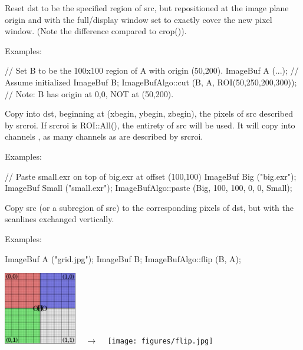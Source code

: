  
\NEW  %
Reset {\cf dst} to be the specified region of {\cf src}, but repositioned at
the image plane origin and with the full/display window set to exactly cover
the new pixel window.  (Note the difference compared to {\cf crop()}).

\smallskip
\noindent Examples:
\begin{code}
    // Set B to be the 100x100 region of A with origin (50,200).
    ImageBuf A (...);  // Assume initialized
    ImageBuf B;
    ImageBufAlgo::cut (B, A, ROI(50,250,200,300));
    // Note: B has origin at 0,0, NOT at (50,200).
\end{code}
\apiend


 
Copy into {\cf dst}, beginning at {\cf (xbegin, ybegin, zbegin)}, the pixels of
{\cf src} described by {\cf srcroi}.  If {\cf srcroi} is {\cf ROI::All()},
the entirety of src will be used.  It will copy into channels 
{\cf [chbegin...]}, as many channels as are described by {\cf srcroi}.

\smallskip
\noindent Examples:
\begin{code}
    // Paste small.exr on top of big.exr at offset (100,100)
    ImageBuf Big ("big.exr");
    ImageBuf Small ("small.exr");
    ImageBufAlgo::paste (Big, 100, 100, 0, 0, Small);
\end{code}
\apiend


 
Copy {\cf src} (or a subregion of {\cf src}) to the corresponding pixels
of {\cf dst}, but with the scanlines exchanged vertically.

\smallskip
\noindent Examples:
\begin{code}
    ImageBuf A ("grid.jpg");
    ImageBuf B;
    ImageBufAlgo::flip (B, A);
\end{code}
\spc \includegraphics[width=1.25in]{figures/grid-small.jpg} 
~ {\Huge $\rightarrow$} ~
\texttt{[image: figures/flip.jpg]} \\
\apiend


